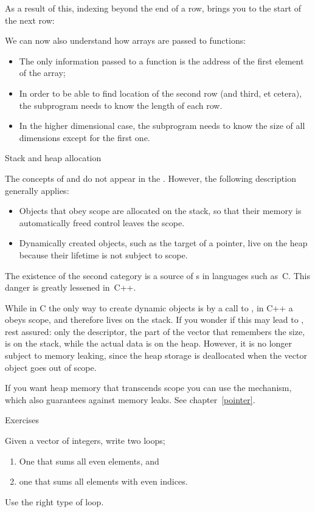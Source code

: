 As a result of this, indexing beyond the end of a row, brings you to the
start of the next row:
%

We can now also understand how arrays are passed to functions:
\begin{itemize}
\item The only information passed to a function is the address of the
  first element of the array;
\item In order to be able to find location of the second row (and
  third, et cetera), the subprogram needs to know the length of each
  row.
\item In the higher dimensional case, the subprogram needs to know the
  size of all dimensions except for the first one.
\end{itemize}

 {Stack and heap allocation}
\label{sec:stack-heap}

The concepts of  and  do not appear
in the . However, the following
description generally applies:
\begin{itemize}
\item Objects that obey scope are allocated on the stack, so that
  their memory is automatically freed control leaves the scope.
\item Dynamically created objects, such as the target of a pointer,
  live on the heap because their lifetime is not subject to scope.
\end{itemize}
The existence of the second category is a source of
s in languages such as~C. This danger is
greatly lessened in~C++.

While in C the only way to create dynamic objects is by a call to
, in C++ a  obeys scope, and
therefore lives on the stack. If you wonder if this may lead to
, rest assured: only the descriptor, the
part of the vector that remembers the size, is on the stack, while the
actual data is on the heap. However, it is no longer subject to memory
leaking, since the heap storage is deallocated when the vector object
goes out of scope.

If you want heap memory that transcends scope you can use the
 mechanism, which also guarantees against
memory leaks. See chapter~\ref{pointer}.

 {Exercises}

\begin{exercise}
  Given a vector of integers, write two loops;
  \begin{enumerate}
  \item One that sums all even elements, and
  \item one that sums all elements with even indices.
  \end{enumerate}
  Use the right type of loop.
\end{exercise}

